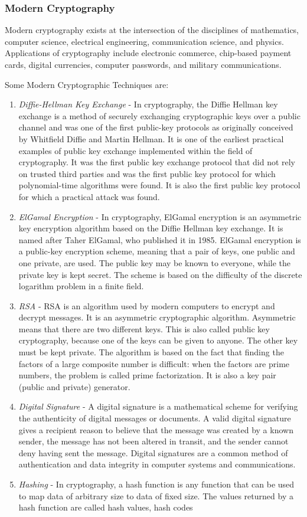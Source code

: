 \documentclass[openany]{book}
\begin{document}
\subsubsection{Modern Cryptography}

Modern cryptography exists at the intersection of the disciplines of mathematics, computer science, electrical engineering, communication science, and physics. Applications of cryptography include electronic commerce, chip-based payment cards, digital currencies, computer passwords, and military communications.

Some Modern Cryptographic Techniques are:

\begin{enumerate}
	\item \textit{Diffie-Hellman Key Exchange} - In cryptography, the Diffie Hellman key exchange is a method of securely exchanging cryptographic keys over a public channel and was one of the first public-key protocols as originally conceived by Whitfield Diffie and Martin Hellman. It is one of the earliest practical examples of public key exchange implemented within the field of cryptography. It was the first public key exchange protocol that did not rely on trusted third parties and was the first public key protocol for which polynomial-time algorithms were found. It is also the first public key protocol for which a practical attack was found.
	\item \textit{ElGamal Encryption} - In cryptography, ElGamal encryption is an asymmetric key encryption algorithm based on the Diffie Hellman key exchange. It is named after Taher ElGamal, who published it in 1985. ElGamal encryption is a public-key encryption scheme, meaning that a pair of keys, one public and one private, are used. The public key may be known to everyone, while the private key is kept secret. The scheme is based on the difficulty of the discrete logarithm problem in a finite field.
	\item \textit{RSA} - RSA is an algorithm used by modern computers to encrypt and decrypt messages. It is an asymmetric cryptographic algorithm. Asymmetric means that there are two different keys. This is also called public key cryptography, because one of the keys can be given to anyone. The other key must be kept private. The algorithm is based on the fact that finding the factors of a large composite number is difficult: when the factors are prime numbers, the problem is called prime factorization. It is also a key pair (public and private) generator.
	\item \textit{Digital Signature} - A digital signature is a mathematical scheme for verifying the authenticity of digital messages or documents. A valid digital signature gives a recipient reason to believe that the message was created by a known sender, the message has not been altered in transit, and the sender cannot deny having sent the message. Digital signatures are a common method of authentication and data integrity in computer systems and communications.
	\item \textit{Hashing} - In cryptography, a hash function is any function that can be used to map data of arbitrary size to data of fixed size. The values returned by a hash function are called hash values, hash codes


\end{enumerate}
\end{document}
